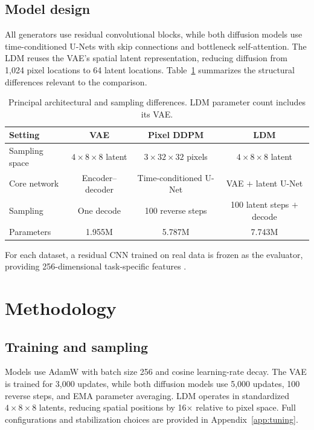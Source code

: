 \documentclass{article}
\begin{document}
\subsection{Model design}

All generators use residual convolutional blocks, while both diffusion models use time-conditioned U-Nets with skip connections and bottleneck self-attention. The LDM reuses the VAE's spatial latent representation, reducing diffusion from 1,024 pixel locations to 64 latent locations. Table~\ref{tab:configuration} summarizes the structural differences relevant to the comparison.

\begin{table}[H]
\caption{Principal architectural and sampling differences. LDM parameter count includes its VAE.}
\label{tab:configuration}
\centering
\small
\begin{tabular}{lccc}
\toprule
Setting & VAE & Pixel DDPM & LDM \\
\midrule
Sampling space
& $4\!\times\!8\!\times\!8$ latent
& $3\!\times\!32\!\times\!32$ pixels
& $4\!\times\!8\!\times\!8$ latent \\

Core network
& Encoder--decoder
& Time-conditioned U-Net
& VAE $+$ latent U-Net \\

Sampling
& One decode
& 100 reverse steps
& 100 latent steps $+$ decode \\

Parameters
& 1.955M
& 5.787M
& 7.743M \\
\bottomrule
\end{tabular}
\end{table}

For each dataset, a residual CNN trained on real data is frozen as the evaluator, providing 256-dimensional task-specific features \citep{he2016resnet}.

\section{Methodology}

\subsection{Training and sampling}
Models use AdamW \citep{loshchilov2019adamw} with batch size 256 and cosine learning-rate decay. The VAE is trained for 3,000 updates, while both diffusion models use 5,000 updates, 100 reverse steps, and EMA parameter averaging. LDM operates in standardized $4\times8\times8$ latents, reducing spatial positions by 16$\times$ relative to pixel space. Full configurations and stabilization choices are provided in Appendix~\ref{app:tuning}.
\end{document}

